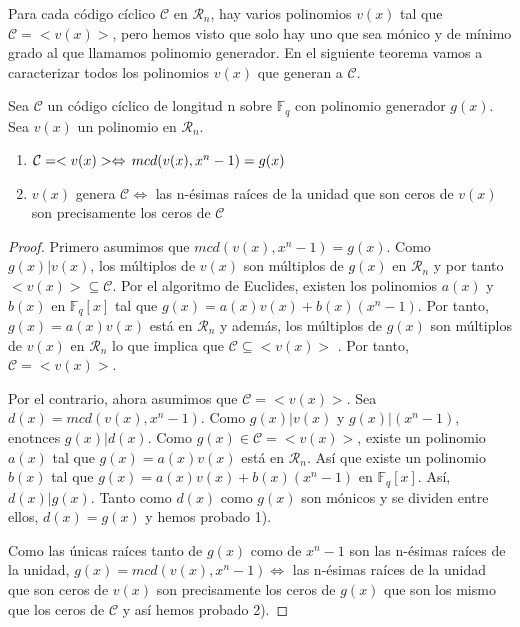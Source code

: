 Para cada código cíclico $\mathcal{C}$ en $\mathcal{R}_n$, hay varios polinomios $v(x)$ tal que $\mathcal{C} = < v(x) >$, pero hemos visto que solo hay uno que sea mónico y de mínimo grado al que llamamos polinomio generador. En el siguiente teorema vamos a caracterizar todos los polinomios $v(x)$ que generan a $\mathcal{C}$.

\begin{theorem}
Sea $\mathcal{C}$ un código cíclico de longitud n sobre $\mathbb{F}_q$ con polinomio generador $g(x)$. Sea $v(x)$ un polinomio en $\mathcal{R}_n$.
\begin{enumerate}
	\item $\mathcal{C} = <v(x)> \Leftrightarrow \thinspace mcd(v(x),x^n-1) = g(x)$
	\item $v(x)$ genera $\mathcal{C} \Leftrightarrow $ las n-ésimas raíces de la unidad que son ceros de $v(x)$ son precisamente los ceros de $\mathcal{C}$
\end{enumerate}
\end{theorem}


\begin{proof}
Primero asumimos que $mcd(v(x),x^n-1) = g(x)$. Como $g(x) | v(x)$, los múltiplos de $v(x)$ son múltiplos de $g(x)$ en $\mathcal{R}_n$ y por tanto $<v(x)> \subseteq \mathcal{C}$. Por el algoritmo de Euclides, existen los polinomios $a(x)$ y $b(x)$ en $\mathbb{F}_q[x]$ tal que $g(x) = a(x)v(x) + b(x)(x^n-1)$. Por tanto, $g(x) = a(x)v(x)$ está en  $\mathcal{R}_n$ y además, los múltiplos de $g(x)$ son múltiplos de $v(x)$ en $\mathcal{R}_n$ lo que implica que $\mathcal{C} \subseteq <v(x)>$ . Por tanto, $\mathcal{C} = <v(x)>$.

Por el contrario, ahora asumimos que $\mathcal{C} = <v(x)>$. Sea $d(x) =  mcd(v(x),x^n-1)$. Como $g(x) | v(x)$ y $g(x) | (x^n-1) $, enotnces $g(x) | d(x)$. Como $g(x) \in \mathcal{C} = <v(x)>$, existe un polinomio $a(x)$ tal que $g(x) = a(x)v(x)$ está en  $\mathcal{R}_n$. Así que existe un polinomio $b(x)$ tal que  $g(x) = a(x)v(x) + b(x)(x^n-1)$ en $\mathbb{F}_q[x]$. Así, $d(x) | g(x)$. Tanto como $d(x)$ como $g(x)$ son mónicos y se dividen entre ellos, $d(x) = g(x)$ y hemos probado 1).

Como las únicas raíces tanto de $g(x)$ como de $x^n-1$ son las n-ésimas raíces  de la unidad, $g(x) = mcd(v(x),x^n-1) \Leftrightarrow  $ las n-ésimas raíces de la unidad que son ceros de $v(x)$ son precisamente los ceros de $g(x)$ que son los mismo que los ceros de $\mathcal{C}$ y así hemos probado 2).

\end{proof}

